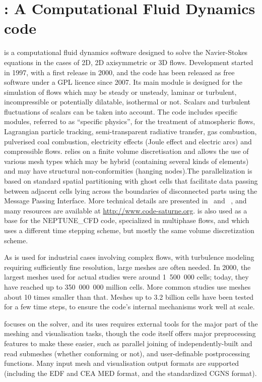 \section{\CS: A Computational Fluid Dynamics code}
\label{sec:cs}
\CS is a computational fluid dynamics software designed to solve the
Navier-Stokes equations in the cases of 2D, 2D axisymmetric or 3D
flows. Development started in 1997, with a first release in 2000, and the
code has been released as free software under a GPL licence since 2007.
Its main module is designed for the simulation of flows which may be
steady or unsteady, laminar or turbulent, incompressible or potentially
dilatable, isothermal or not. Scalars and turbulent fluctuations of scalars can
be taken into account. The code includes specific modules, referred to as
``specific physics'', for the treatment of atmospheric flows, Lagrangian particle
tracking, semi-transparent radiative transfer, gas combustion, pulverised coal
combustion, electricity effects (Joule effect and electric arcs) and
compressible flows. \CS relies on a finite volume discretisation and
allows the use of various mesh types which may be hybrid (containing several
kinds of elements) and may have structural non-conformities (hanging nodes).The
parallelization is based on standard spatial partitioning with ghost cells
that facilitate data passing between adjacent cells lying across the boundaries
of disconnected parts using the Message Passing Interface. More
technical details are presented in~\cite{cs2004} and ~\cite{userguide},
and many resources are available at \url{http://www.code-saturne.org}.
\CS is also used as a base for the NEPTUNE\_CFD code, specialized in
multiphase flows, and which uses a different time stepping scheme,
but mostly the same volume discretization scheme.

As \CS is used for industrial cases involving complex flows, with turbulence
modeling requiring sufficiently fine resolution, large meshes are often
needed. In 2000, the largest meshes used for actual studies were around
1~500~000 cells; today, they have reached up to 350~000~000 million cells.
More common studies use meshes about 10 times smaller than that.
Meshes up to 3.2 billion cells have been tested for a few time steps, to
ensure the code's internal mechanisms work well at scale.

\CS focuses on the solver, and its uses requires external tools for the
major part of the meshing and visualisation tasks, though the code itself offers
major preprocessing features to make these easier, such as parallel joining
of independently-built and read submeshes (whether conforming or not),
and user-definable postprocessing functions. Many input mesh and visualisation
output formats are supported (including the EDF and CEA MED format,
and the standardized CGNS format).

